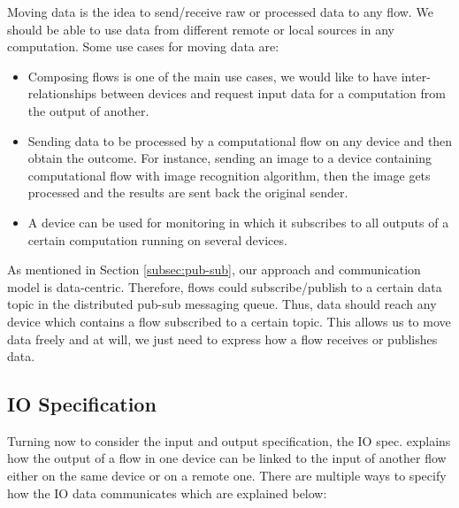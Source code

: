 Moving data is the idea  to send/receive raw or processed data to any flow. We should be  able to use data from different remote or local sources in any computation. Some use cases for moving data are:
\begin{itemize}
\item Composing flows is one of the main use cases, we would like to have inter-relationships between devices and  request input data for a computation from the output of another.

\item Sending data to be processed by a computational flow on any device and then obtain the outcome. For instance, sending an image to a device containing computational flow with image recognition algorithm, then the image gets processed and the results are sent back the original sender. 

\item A device can be used for monitoring  in which it subscribes to all outputs of a certain computation running on several devices.

\end{itemize} 
 As mentioned in Section \ref{subsec:pub-sub}, our approach and communication model is data-centric. Therefore, flows could subscribe/publish to a certain data topic in the distributed pub-sub messaging queue. Thus, data should reach any device which contains a flow subscribed to a certain topic. This allows us to move data freely and at will, we just need to express how a flow receives or publishes data.

\subsection{IO Specification}
Turning now to consider the input and output specification, the IO spec. explains how the output of a flow in one device can be linked to the input of another flow either on the same device or on a remote one. There are multiple ways to specify how the IO data communicates which are explained below:



